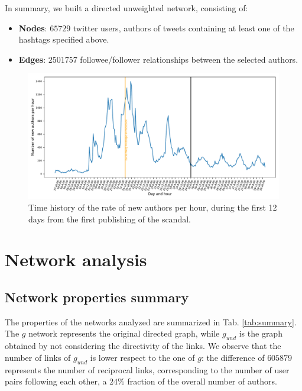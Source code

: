 \documentclass[11pt, twoside]{report}
\begin{document}
    In summary, we built a directed unweighted network, consisting of:

    \begin{itemize}
    \item \textbf{Nodes}: $65729$ twitter users, authors of tweets containing at least one of the hashtags specified above.

    \item \textbf{Edges}: $2501757$ followee/follower relationships between the selected authors.
    \end{itemize}

    
    \begin{figure}[htbp]
      \centering
\includegraphics[width=\textwidth]{../../scripts/network_analysis/imgs/time_history.pdf}
      \caption{Time history of the rate of new authors per hour, during the first 12 days from the first publishing of the scandal.}
      \label{fig:time_history}
    \end{figure}



    
    \chapter{Network analysis}
\section{Network properties summary} 


The properties of the networks analyzed are summarized in Tab. \ref{tab:summary}. The $g$ network represents the original directed graph, while
$g_{und}$ is the graph obtained by not considering the directivity of the links. We observe that the number of links of $g_{und}$ is lower respect to the one of $g$: the difference of $605879$ represents the number of reciprocal links, corresponding to the number of user pairs following each other, a $24\%$ fraction of the overall number of authors.
\end{document}
